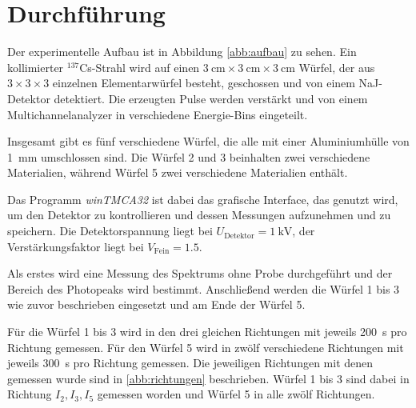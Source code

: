 \section{Durchführung}

Der experimentelle Aufbau ist in Abbildung \ref{abb:aufbau} zu sehen. Ein kollimierter $^{137}$Cs-Strahl wird auf einen $\SI{3}{\centi\meter}\times\SI{3}{\centi\meter}\times\SI{3}{\centi\meter}$ Würfel, der aus $\num{3}\times\num{3}\times\num{3}$ einzelnen Elementarwürfel besteht, geschossen und von einem NaJ-Detektor detektiert. Die erzeugten Pulse werden verstärkt und von einem Multichannelanalyzer in verschiedene Energie-Bins eingeteilt.

Insgesamt gibt es fünf verschiedene Würfel, die alle mit einer Aluminiumhülle von \SI{1}{\milli\meter} umschlossen sind. Die Würfel 2 und 3 beinhalten zwei verschiedene Materialien, während Würfel 5 zwei verschiedene Materialien enthält. 

Das Programm \textit{winTMCA32} ist dabei das grafische Interface, das genutzt wird, um den Detektor zu kontrollieren und dessen Messungen aufzunehmen und zu speichern. 
Die Detektorspannung liegt bei $U_\text{Detektor} = \SI{1}{\kilo\volt}$, der Verstärkungsfaktor liegt bei $V_\text{Fein}=\num{1.5}$. 

Als erstes wird eine Messung des Spektrums ohne Probe durchgeführt und der Bereich des Photopeaks wird bestimmt.  
Anschließend werden die Würfel 1 bis 3 wie zuvor beschrieben eingesetzt und am Ende der Würfel 5. 

Für die Würfel 1 bis 3 wird in den drei gleichen Richtungen mit jeweils \SI{200}{\second} pro Richtung gemessen. 
Für den Würfel 5 wird in zwölf verschiedene Richtungen mit jeweils \SI{300}{\second} pro Richtung gemessen.
Die jeweiligen Richtungen mit denen gemessen wurde sind in \ref{abb:richtungen} beschrieben. Würfel 1 bis 3 sind dabei in Richtung $I_2, I_3, I_5$ gemessen worden und Würfel 5 in alle zwölf Richtungen. 
